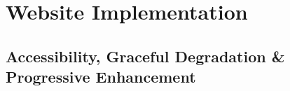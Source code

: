 
\section{Website Implementation}
\subsection{Accessibility, Graceful Degradation \& Progressive Enhancement}

